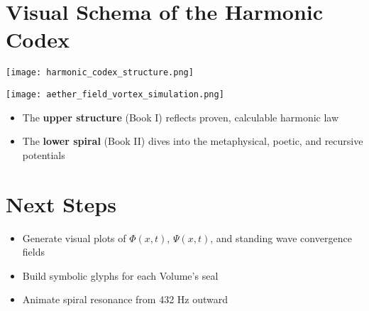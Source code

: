 \documentclass[12pt]{article}
\begin{document}
\newpage

\section*{Visual Schema of the Harmonic Codex}

\begin{center}
\texttt{[image: harmonic\_codex\_structure.png]}
\end{center}

\vspace{0.5cm}

\begin{center}
\texttt{[image: aether\_field\_vortex\_simulation.png]}
\end{center}

\vspace{0.5cm}

\begin{itemize}
    \item The \textbf{upper structure} (Book I) reflects proven, calculable harmonic law
    \item The \textbf{lower spiral} (Book II) dives into the metaphysical, poetic, and recursive potentials
\end{itemize}

\section*{Next Steps}
\begin{itemize}
    \item Generate visual plots of $\Phi(x,t)$, $\Psi(x,t)$, and standing wave convergence fields
    \item Build symbolic glyphs for each Volume’s seal
    \item Animate spiral resonance from 432 Hz outward
\end{itemize}
\end{document}
